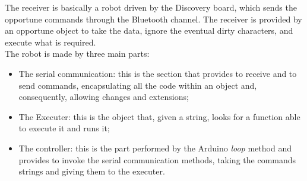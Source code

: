 The receiver is basically a robot driven by the Discovery board, which sends the opportune commands through the Bluetooth channel. The receiver is provided by an opportune object to take the data, ignore the eventual dirty characters, and execute what is required.\\
The robot is made by three main parts:
\begin{itemize}
	\item The serial communication: this is the section that provides to receive and to send commands, encapsulating all the code within an object and, consequently, allowing changes and extensions;
	\item The Executer: this is the object that, given a string, looks for a function able to execute it and runs it;
	\item The controller: this is the part performed by the Arduino \textit{loop} method and provides to invoke the serial communication methods, taking the commands strings and giving them to the executer.
\end{itemize}

